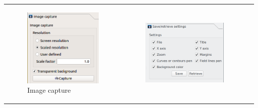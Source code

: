 \documentclass[10pt]{article}
\begin{document}
\hspace*{-6mm}
\begin{tabular}{lcr}
\begin{minipage}{.3\linewidth}
\begin{figure}[H]
    \begin{center}
        \includegraphics[width=.7\linewidth]{damqt_fig_3_10.png}
    \end{center}
    \vspace*{-1mm}
    \caption{Image capture \label{fig:3_10}}
\end{figure}
\end{minipage}
&
\begin{minipage}{.3\linewidth}
    \begin{figure}[H]
        \begin{center}
            \hspace*{-5mm}
            \includegraphics[width=0.92\linewidth]{damqt320_2D_save_retrieve.png}

\end{center}
\end{figure}
\end{minipage}
\end{tabular}
\end{document}
